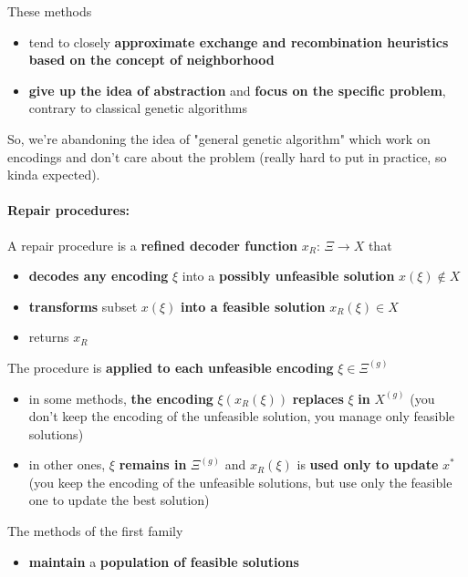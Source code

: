 \documentclass[11pt]{article}
\begin{document}
	These methods
	\begin{itemize}
		\item tend to closely \textbf{approximate exchange and recombination heuristics based on the concept of neighborhood}
		\item \textbf{give up the idea of abstraction} and \textbf{focus on the specific problem}, contrary to classical genetic algorithms
	\end{itemize}
	So, we're abandoning the idea of "general genetic algorithm" which work on encodings and don't care about the problem (really hard to put in practice, so kinda expected).\\
	
	\newpage
	
	\paragraph{Repair procedures:} A repair procedure is a \textbf{refined decoder function} $x_R : \, \Xi \rightarrow X$ that 
	\begin{itemize}
		\item \textbf{decodes any encoding} $\xi$ into a \textbf{possibly unfeasible solution} $x (\xi) \notin X$
		\item \textbf{transforms} subset $x (\xi)$ \textbf{into a feasible solution} $x_R (\xi) \in X$
		\item returns $x_R$
	\end{itemize}
	
	The procedure is \textbf{applied to each unfeasible encoding} $\xi \in \Xi^{(g)}$
	\begin{itemize}
		\item in some methods, \textbf{the encoding} $\xi (x_R (\xi))$ \textbf{replaces} $\xi$ \textbf{in} $X^{(g)}$ (you don't keep the encoding of the unfeasible solution, you manage only feasible solutions)
		\item in other ones, $\xi$ \textbf{remains in} $\Xi^{(g)}$ and $x_R (\xi)$ is \textbf{used only to update} $x^\ast$ (you keep the encoding of the unfeasible solutions, but use only the feasible one to update the best solution)
	\end{itemize}
	
	The methods of the first family
	\begin{itemize}
		\item \textbf{maintain} a \textbf{population of feasible solutions}
	\end{itemize}
	
\end{document}
